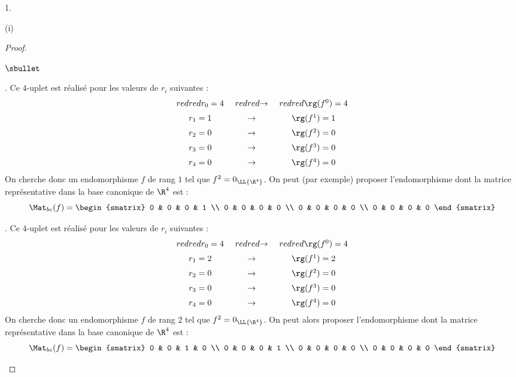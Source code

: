 \begin{noliste}{1.}
\begin{noliste}{(i)}
\begin{proof}
\begin{noliste}{$\sbullet$}
        \item {}. Ce
          $4$-uplet est réalisé pour les valeurs de $r_i$ suivantes :
          \[
          \begin{array}{c@{\ \quad}c@{\ \quad}c}
            \color{red}{r_0 = 4} & \color{red}{\rightarrow} &
            \color{red}{\rg(f^0) = 4} \\[.2cm] 
            r_1 = 1 & \rightarrow & \rg(f^1) = 1 \\[.2cm]
            r_2 = 0 & \rightarrow & \rg(f^2) = 0 \\[.2cm]
            r_3 = 0 & \rightarrow & \rg(f^3) = 0 \\[.2cm]
            r_4 = 0 & \rightarrow & \rg(f^4) = 0 
          \end{array}
          \]
          On cherche donc un endomorphisme $f$ de rang $1$ tel que
          $f^2 = 0_{\LL{\R^4}}$. On peut (par exemple) proposer
          l'endomorphisme dont la matrice représentative dans la base
          canonique de $\R^4$ est :
          \[
          \Mat_{bc}(f) =
          \begin{smatrix}
            0 & 0 & 0 & 1 \\
            0 & 0 & 0 & 0 \\
            0 & 0 & 0 & 0 \\
            0 & 0 & 0 & 0 
          \end{smatrix}
          \]

        \item {}. Ce
          $4$-uplet est réalisé pour les valeurs de $r_i$ suivantes :
          \[
          \begin{array}{c@{\ \quad}c@{\ \quad}c}
            \color{red}{r_0 = 4} & \color{red}{\rightarrow} &
            \color{red}{\rg(f^0) = 4} \\[.2cm] 
            r_1 = 2 & \rightarrow & \rg(f^1) = 2 \\[.2cm]
            r_2 = 0 & \rightarrow & \rg(f^2) = 0 \\[.2cm]
            r_3 = 0 & \rightarrow & \rg(f^3) = 0 \\[.2cm]
            r_4 = 0 & \rightarrow & \rg(f^4) = 0 
          \end{array}
          \]
          On cherche donc un endomorphisme $f$ de rang $2$ tel que
          $f^2 = 0_{\LL{\R^4}}$. On peut alors proposer
          l'endomorphisme dont la matrice représentative dans la base
          canonique de $\R^4$ est :
          \[
          \Mat_{bc}(f) =
          \begin{smatrix}
            0 & 0 & 1 & 0 \\
            0 & 0 & 0 & 1 \\
            0 & 0 & 0 & 0 \\
            0 & 0 & 0 & 0 
          \end{smatrix}
          \]



\end{noliste}
\end{proof}
\end{noliste}
\end{noliste}
